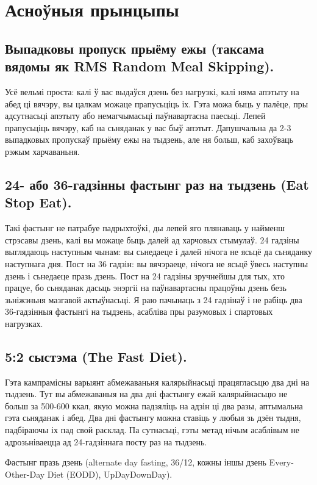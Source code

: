 \section{Асноўныя прынцыпы}

\subsection{Выпадковы пропуск прыёму ежы (таксама вядомы як RMS Random Meal Skipping).}
Усё вельмі проста: калі ў вас выдаўся дзень без нагрузкі, калі няма апэтыту на абед ці вячэру, вы цалкам можаце прапусьціць іх. Гэта можа быць у палёце, пры адсутнасьці апэтыту або немагчымасьці паўнавартасна паесьці. Лепей прапусьціць вячэру, каб на сьняданак у вас быў апэтыт. Дапушчальна да 2-3 выпадковых пропускаў прыёму ежы на тыдзень, але ня больш, каб захоўваць рэжым харчаваньня.

\subsection{24- або 36-гадзінны фастынг раз на тыдзень (Eat Stop Eat).}
Такі фастынг не патрабуе падрыхтоўкі, ды лепей яго плянаваць у найменш стрэсавы дзень, калі вы можаце быць далей ад харчовых стымулаў. 24 гадзіны выглядаюць наступным чынам: вы сьнедаеце і далей нічога не ясьцё да сьняданку наступнага дня. Пост на 36 гадзін: вы вячэраеце, нічога не ясьцё ўвесь наступны дзень і сьнедаеце празь дзень. Пост на 24 гадзіны зручнейшы для тых, хто працуе, бо сьняданак дасьць энэргіі на паўнавартасны працоўны дзень безь зьніжэньня мазгавой актыўнасьці. Я раю пачынаць з 24 гадзінаў і не рабіць два 36-гадзінныя фастынгі на тыдзень, асабліва пры разумовых і спартовых нагрузках.

\subsection{5:2 сыстэма (The Fast Diet).}
Гэта кампрамісны варыянт абмежаваньня калярыйнасьці працягласьцю два дні на тыдзень. Тут вы абмежаваныя на два дні фастынгу ежай калярыйнасьцю не больш за 500-600 ккал, якую можна падзяліць на адзін ці два разы, аптымальна гэта сьняданак і абед. Два дні фастынгу можна ставіць у любыя зь дзён тыдня, падбіраючы іх пад свой расклад. Па сутнасьці, гэты метад нічым асаблівым не адрозьніваецца ад 24-гадзіннага посту раз на тыдзень.

Фастынг празь дзень (alternate day fasting, 36/12, кожны іншы дзень Every-Other-Day Diet (EODD), UpDayDownDay).


